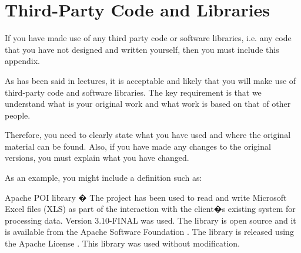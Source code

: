 \chapter{Third-Party Code and Libraries}


If you have made use of any third party code or software libraries, i.e. any code that you have not designed and written yourself, then you must include this appendix.

As has been said in lectures, it is acceptable and likely that you will make use of third-party code and software libraries. The key requirement is that we understand what is your original work and what work is based on that of other people.

Therefore, you need to clearly state what you have used and where the original material can be found. Also, if you have made any changes to the original versions, you must explain what you have changed.

As an example, you might include a definition such as:

Apache POI library � The project has been used to read and write Microsoft Excel files (XLS) as part of the interaction with the client�s existing system for processing data. Version 3.10-FINAL was used. The library is open source and it is available from the Apache Software Foundation
\cite{apache_poi}. The library is released using the Apache License
\cite{apache_license}. This library was used without modification.


